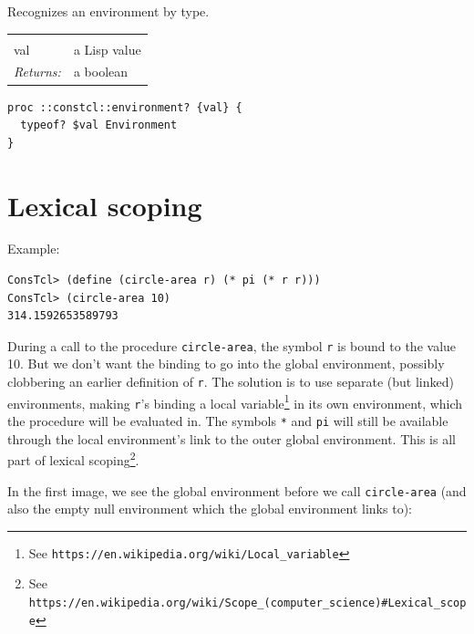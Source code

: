 \documentclass[twoside,9pt]{report}
\begin{document}
Recognizes an environment by type.

\noindent\begin{tabular}{ |p{1.9cm} p{8cm}| }
\hline
\rowcolor[HTML]{CCCCCC} \multicolumn{2}{|l|}{\bf environment? (public)} \\
val & a Lisp value \\
\textit{Returns:} & a boolean \\
\hline
\end{tabular}
\begin{lstlisting}
proc ::constcl::environment? {val} {
  typeof? $val Environment
}
\end{lstlisting}
\section{Lexical scoping}
\label{lexical-scoping}


Example:

\begin{verbatim}
ConsTcl> (define (circle-area r) (* pi (* r r)))
ConsTcl> (circle-area 10)
314.1592653589793
\end{verbatim}


During a call to the procedure \texttt{circle-area}, the symbol \texttt{r} is bound to the value 10. But we don't want the binding to go into the global environment, possibly clobbering an earlier definition of \texttt{r}. The solution is to use separate (but linked) environments, making \texttt{r}'s binding a local variable\footnote{See \texttt{https://en.wikipedia.org/wiki/Local\_variable}} in its own environment, which the procedure will be evaluated in. The symbols \texttt{*} and \texttt{pi} will still be available through the local environment's link to the outer global environment. This is all part of lexical scoping\footnote{See \texttt{https://en.wikipedia.org/wiki/Scope\_(computer\_science)\#Lexical\_scope}}.


In the first image, we see the global environment before we call \texttt{circle-area} (and also the empty null environment which the global environment links to):
\end{document}
